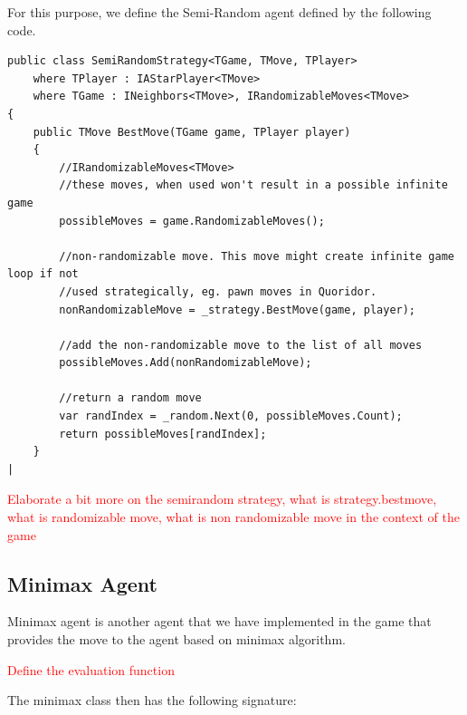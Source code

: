 For this purpose, we define the Semi-Random agent defined by the following code. 

\begin{lstlisting}
public class SemiRandomStrategy<TGame, TMove, TPlayer>
    where TPlayer : IAStarPlayer<TMove>
    where TGame : INeighbors<TMove>, IRandomizableMoves<TMove>
{
    public TMove BestMove(TGame game, TPlayer player)
    {
        //IRandomizableMoves<TMove>
        //these moves, when used won't result in a possible infinite game
        possibleMoves = game.RandomizableMoves();

        //non-randomizable move. This move might create infinite game loop if not 
        //used strategically, eg. pawn moves in Quoridor.
        nonRandomizableMove = _strategy.BestMove(game, player);

        //add the non-randomizable move to the list of all moves
        possibleMoves.Add(nonRandomizableMove);

        //return a random move
        var randIndex = _random.Next(0, possibleMoves.Count);
        return possibleMoves[randIndex];
    }
|
\end{lstlisting}

\textcolor{red}{Elaborate a bit more on the semirandom strategy, what is strategy.bestmove, what is randomizable move, what is non randomizable move in the context of the game}


\subsection{Minimax Agent}

Minimax agent is another agent that we have implemented in the game that provides the move to the agent based on minimax algorithm. 

\textcolor{red}{Define the evaluation function}

The minimax class then has the following signature:

